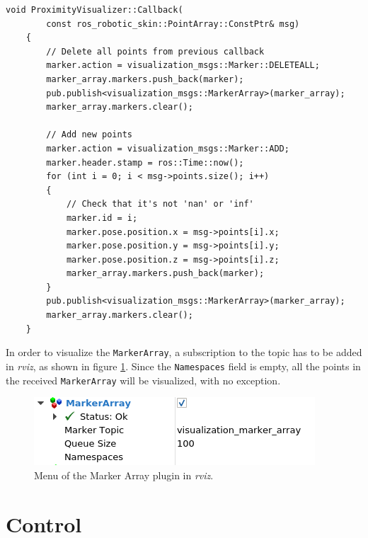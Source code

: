 \begin{lstlisting}[caption={Callback of the ProximityVisualizer class},captionpos=b,label={lst:visualizercallback}]
    void ProximityVisualizer::Callback(
        const ros_robotic_skin::PointArray::ConstPtr& msg)
    {
        // Delete all points from previous callback
        marker.action = visualization_msgs::Marker::DELETEALL;
        marker_array.markers.push_back(marker);
        pub.publish<visualization_msgs::MarkerArray>(marker_array);
        marker_array.markers.clear();

        // Add new points
        marker.action = visualization_msgs::Marker::ADD;
        marker.header.stamp = ros::Time::now();
        for (int i = 0; i < msg->points.size(); i++)
        {
            // Check that it's not 'nan' or 'inf'
            marker.id = i;
            marker.pose.position.x = msg->points[i].x;
            marker.pose.position.y = msg->points[i].y;
            marker.pose.position.z = msg->points[i].z;
            marker_array.markers.push_back(marker);
        }
        pub.publish<visualization_msgs::MarkerArray>(marker_array);
        marker_array.markers.clear();
    }
\end{lstlisting}

In order to visualize the \lstinline{MarkerArray}, a subscription to the topic has to be added in \textit{rviz}, as shown in figure \ref{fig:markerarrayrviz}. Since the \lstinline{Namespaces} field is empty, all the points in the received \lstinline{MarkerArray} will be visualized, with no exception.

\begin{figure}[H]
    \caption[Spheres]{
    Menu of the Marker Array plugin in \textit{rviz}.
    }
    \begin{center}
    \includegraphics[scale=0.75]{figs/markerarrayrviz.png}
    \end{center}
\label{fig:markerarrayrviz}
\end{figure}





\section{Control}
\label{s:control}

